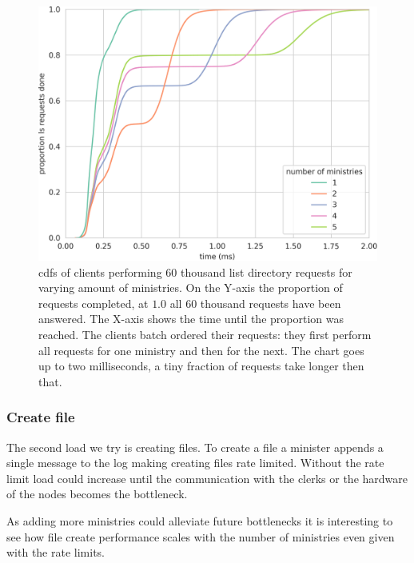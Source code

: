 \begin{figure}[htb]
	\centering
	\includegraphics[height=\textheight]{../results/plots/ls_batch.png}
	\caption{\acp{cdf} of clients performing 60 thousand list directory requests for varying amount of ministries. On the Y-axis the proportion of requests completed, at $1.0$ all 60 thousand requests have been answered. The X-axis shows the time until the proportion was reached. The clients batch ordered their requests: they first perform all requests for one ministry and then for the next. The chart goes up to two milliseconds, a tiny fraction of requests take longer then that.}
	\label{fig:ls_cdf}
\end{figure}

\clearpage{}
\subsubsection{Create file}
The second load we try is creating files. To create a file a minister appends a single message to the log making creating files rate limited. Without the rate limit load could increase until the communication with the clerks or the hardware of the nodes becomes the bottleneck.%

As adding more ministries could alleviate future bottlenecks it is interesting to see how file create performance scales with the number of ministries even given with the rate limits.

